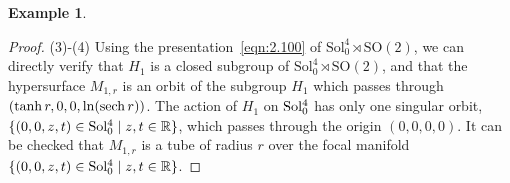 \documentclass[reqno]{amsart}%
\theoremstyle{definition}
\newtheorem{example}{Example}[section]  %
\numberwithin{equation}{section}
\begin{document}
\begin{example}
\begin{proof}
			(3)-(4) Using the presentation~\eqref{eqn:2.100} of $\mathrm{Sol}^4_0 \rtimes \mathrm{SO}(2)$,
			we can directly verify that $H_1$ is a closed subgroup of $\mathrm{Sol}^4_0 \rtimes \mathrm{SO}(2)$,
			and that the hypersurface $M_{1,r}$ is an orbit
			of the subgroup $H_1$ which passes through $(\tanh r,0,0,\ln({\rm sech}\, r))$.
			The action of $H_1$ on ${\rm Sol_0^4}$ has only one singular orbit,
			$\{(0,0,z,t)\in {\rm Sol_0^4}\mid z,t\in \mathbb{R}\}$, which passes through the origin $(0,0,0,0)$.
			It can be checked that $M_{1,r}$ is a tube of radius $r$
			over the focal manifold
			$\{(0,0,z,t)\in {\rm Sol_0^4}\mid z,t\in \mathbb{R}\}$.
		\end{proof}
	\end{example}
	
\end{document}
